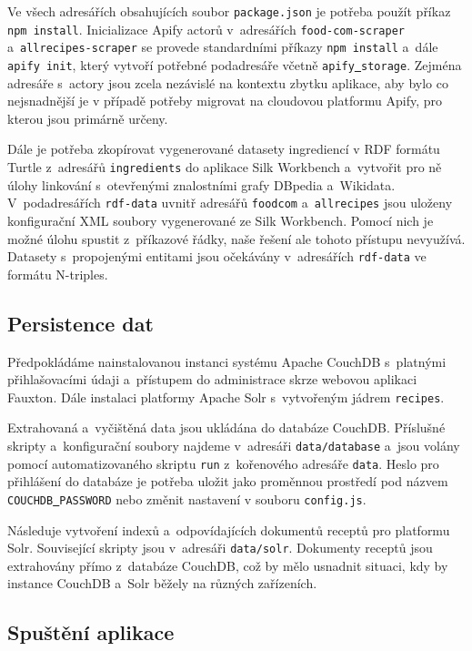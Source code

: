 \documentclass[12pt,a4paper]{report}
\begin{document}
Ve všech adresářích obsahujících soubor \texttt{package.json} je potřeba použít příkaz \texttt{npm\,install}. Inicializace Apify actorů v~adresářích \texttt{food-com-scraper} a~\texttt{allrecipes-scraper} se provede standardními příkazy \texttt{npm\,install} a~dále \texttt{apify\,init}, který vytvoří potřebné podadresáře včetně \texttt{apify\underline{{ }}storage}. Zejména adresáře s~actory jsou zcela nezávislé na kontextu zbytku aplikace, aby bylo co nejsnadnější je v případě potřeby migrovat na cloudovou platformu Apify, pro kterou jsou primárně určeny.

Dále je potřeba zkopírovat vygenerované datasety ingrediencí v RDF formátu Turtle z~adresářů \texttt{ingredients} do aplikace Silk Workbench a~vytvořit pro ně úlohy linkování s~otevřenými znalostními grafy DBpedia a~Wikidata. V~podadresářích \texttt{rdf-data} uvnitř adresářů \texttt{foodcom} a~\texttt{allrecipes} jsou uloženy konfigurační XML soubory vygenerované ze Silk Workbench. Pomocí nich je možné úlohu spustit z~příkazové řádky, naše řešení ale tohoto přístupu nevyužívá. Datasety s~propojenými entitami jsou očekávány v~adresářích \texttt{rdf-data} ve formátu N-triples.

\subsection{Persistence dat}

Předpokládáme nainstalovanou instanci systému Apache CouchDB s~platnými přihlašovacími údaji a~přístupem do administrace skrze webovou aplikaci \-Fauxton. Dále instalaci platformy Apache Solr s~vytvořeným jádrem \texttt{recipes}.

Extrahovaná a~vyčištěná data jsou ukládána do databáze CouchDB. Příslušné skripty a~konfigurační soubory najdeme v~adresáři \texttt{data/database} a~jsou volány pomocí automatizovaného skriptu \texttt{run} z~kořenového adresáře \texttt{data}. Heslo pro přihlášení do databáze je potřeba uložit jako proměnnou prostředí pod názvem \texttt{COUCHDB\underline{{ }}PASSWORD} nebo změnit nastavení v souboru \texttt{config.js}.

Následuje vytvoření indexů a~odpovídajících dokumentů receptů pro platformu Solr. Související skripty jsou v~adresáři \texttt{data/solr}. Dokumenty receptů jsou extrahovány přímo z~databáze CouchDB, což by mělo usnadnit situaci, kdy by instance CouchDB a~Solr běžely na různých zařízeních.

\subsection{Spuštění aplikace}
\end{document}
